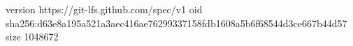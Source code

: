 version https://git-lfs.github.com/spec/v1
oid sha256:d63e8a195a521a3aec416ae76299337158fdb1608a5b6f68544d3ce667b44d57
size 1048672
